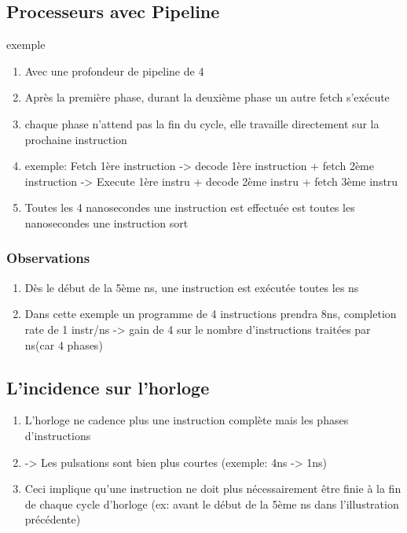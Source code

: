\subsection{Processeurs avec Pipeline}
exemple
\begin{enumerate}
  \item Avec une profondeur de pipeline de 4
  \item Après la première phase, durant la deuxième phase un autre fetch s'exécute
  \item chaque phase n'attend pas la fin du cycle, elle travaille directement sur la prochaine instruction
  \item exemple: Fetch 1ère instruction -> decode 1ère instruction + fetch 2ème instruction -> Execute 1ère instru + decode 2ème instru + fetch 3ème instru
  \item Toutes les 4 nanosecondes une instruction est effectuée est toutes les nanosecondes une instruction sort
\end{enumerate}

\subsubsection{Observations}
\begin{enumerate}
  \item Dès le début de la 5ème ns, une instruction est exécutée toutes les ns
  \item Dans cette exemple un programme de 4 instructions prendra 8ns, completion rate de 1 instr/ns -> gain de 4 sur le nombre d'instructions traitées par ns(car 4 phases)
\end{enumerate}

\subsection{L'incidence sur l'horloge}
\begin{enumerate}
\item L'horloge ne cadence plus une instruction complète mais les phases d'instructions
\item -> Les pulsations sont bien plus courtes (exemple: 4ns -> 1ns)
\item Ceci implique qu'une instruction ne doit plus nécessairement être finie à la fin de chaque cycle d'horloge (ex: avant le début de la 5ème ns dans l'illustration précédente)
\end{enumerate}
